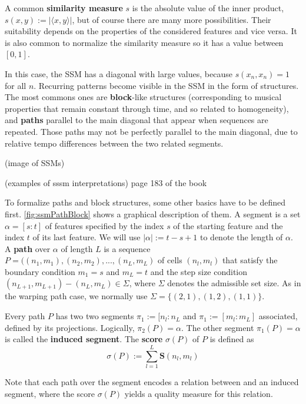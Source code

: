 \documentclass[a4paper, 9pt, twocolumn]{extarticle}
\begin{document}
A common \textbf{similarity measure} $s$ is the absolute value of the inner product, $s(x,y):=|\langle x,y \rangle|$, but of course there are many more possibilities. Their suitability depends on the properties of the considered features and vice versa. It is also common to normalize the similarity measure so it has a value between $[0,1]$. 

In this case, the SSM has a diagonal with large values, because $s(x_{n},x_{n})=1$ for all $n$. Recurring patterns become visible in the SSM in the form of structures. The most commons ones are \textbf{block}-like structures (corresponding to musical properties that remain constant through time, and so related to homogeneity), and \textbf{paths} parallel to the main diagonal that appear when  sequences are repeated. Those paths may not be perfectly parallel to the main diagonal, due to relative tempo differences between the two related segments.

(image of SSMs)

(examples of sssm interpretations) page 183 of the book

To formalize paths and block structures, some other basics have to be defined first. \autoref{fig:ssmPathBlock} shows a graphical description of them. A segment is a set $\alpha=[s:t]$ of features specified by the index $s$ of the starting feature and the index $t$ of its last feature. We will use $|\alpha|:=t-s+1$ to denote the length of $\alpha$. A \textbf{path} over $\alpha$ of length $L$ is a sequence $P=((n_{1},m_{1}), (n_{2},m_{2}), ..., (n_{L},m_{L})$ of cells $(n_{l}, m_{l})$ that satisfy the boundary condition $m_{1}=s$ and $m_{L}=t$ and the step size condition $(n_{L+1},m_{L+1})-(n_{L},m_{L})\in \Sigma$, where $\Sigma$ denotes the admissible set size. As in the warping path case, we normally use $\Sigma=\{(2,1), (1,2), (1,1)\}$.

Every path $P$ has two two segments $\pi_{1}:=[n_{l}:n_{L}$ and $\pi_{1}:=[m_{l}:m_{L}]$ associated, defined by its projections. Logically, $\pi_{2}(P)= \alpha$. The other segment $\pi _{1} (P)= \alpha$ is called the \textbf{induced segment}. The \textbf{score} $\sigma (P)$ of $P$ is defined as\[\sigma(P):= 	\sum_{l=1}^{L}\textbf{S}(n_{l}, m_{l})\]

Note that each path over the segment \alpha encodes a relation between \alpha and an induced segment, where the score $\sigma(P)$ yields a quality measure for this relation.
\end{document}
